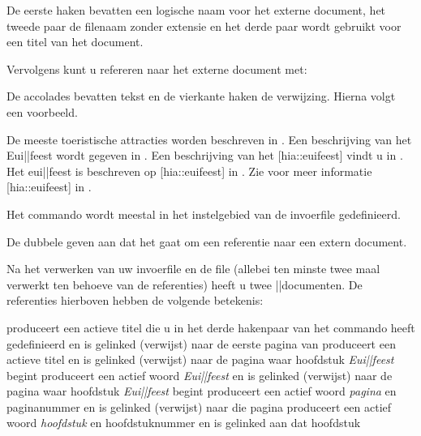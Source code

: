 
De eerste haken bevatten een logische naam voor het externe
document, het tweede paar de filenaam zonder extensie en het
derde paar wordt gebruikt voor een titel van het document.

Vervolgens kunt u refereren naar het externe document met:


De accolades bevatten tekst en de vierkante haken de
verwijzing. Hierna volgt een voorbeeld.

\startbuffer
{}

De meeste toeristische attracties worden beschreven in
\uit[hia]. Een beschrijving van het Eui||feest wordt gegeven
in . Een beschrijving van het
[hia::euifeest] vindt u in \uit[hia]. Het
eui||feest is beschreven op [hia::euifeest] in
\uit[hia]. Zie voor meer informatie
[hia::euifeest] in \uit[hia].
\stopbuffer

\typebuffer

Het commando \type{\gebruikexterndocument} wordt meestal in
het instelgebied van de invoerfile gedefinieerd.

De dubbele \type{::} geven aan dat het gaat om een
referentie naar een extern document.

Na het verwerken van uw invoerfile en de file
 (allebei ten minste twee maal verwerkt
ten behoeve van de referenties) heeft u twee
\PDF||documenten. De referenties hierboven hebben de
volgende betekenis:

\startopsomming[opelkaar]
\som \type{\uit[hia]} produceert een actieve titel die u in
     het derde hakenpaar van het commando
     \type{\gebruikexterndocument} heeft gedefinieerd en is
     gelinked (verwijst) naar de eerste pagina van
\som {} produceert een actieve titel
     en is gelinked (verwijst) naar de pagina waar hoofdstuk {\em
     Eui||feest} begint
\som {} produceert een
     actief woord {\em Eui||feest} en is gelinked (verwijst)
     naar de pagina waar hoofdstuk {\em Eui||feest} begint
\som {} produceert een actief
     woord {\em pagina} en paginanummer en is gelinked
     (verwijst) naar die pagina
\som {} produceert een
     actief woord {\em hoofdstuk} en hoofdstuknummer en is
     gelinked aan dat hoofdstuk
\stopopsomming

